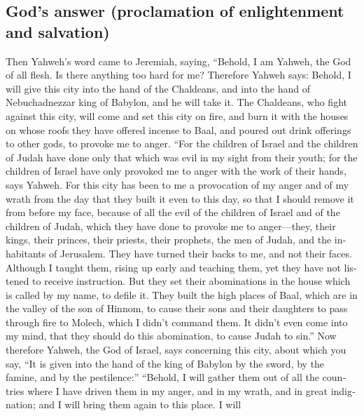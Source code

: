 \begin{paracol}{2}
\begin{otherlanguage}{english}
\hypertarget{gods-answer-proclamation-of-enlightenment-and-salvation}{%
\subsection{God's answer (proclamation of enlightenment and
salvation)}\label{gods-answer-proclamation-of-enlightenment-and-salvation}}

 Then Yahweh's word came to Jeremiah, saying,
 ``Behold, I am Yahweh, the God of all flesh. Is there
anything too hard for me?  Therefore Yahweh says: Behold,
I will give this city into the hand of the Chaldeans, and into the hand
of Nebuchadnezzar king of Babylon, and he will take it. 
The Chaldeans, who fight against this city, will come and set this city
on fire, and burn it with the houses on whose roofs they have offered
incense to Baal, and poured out drink offerings to other gods, to
provoke me to anger.  ``For the children of Israel and
the children of Judah have done only that which was evil in my sight
from their youth; for the children of Israel have only provoked me to
anger with the work of their hands, says Yahweh.  For
this city has been to me a provocation of my anger and of my wrath from
the day that they built it even to this day, so that I should remove it
from before my face,  because of all the evil of the
children of Israel and of the children of Judah, which they have done to
provoke me to anger---they, their kings, their princes, their priests,
their prophets, the men of Judah, and the inhabitants of Jerusalem.
 They have turned their backs to me, and not their faces.
Although I taught them, rising up early and teaching them, yet they have
not listened to receive instruction.  But they set their
abominations in the house which is called by my name, to defile it.
 They built the high places of Baal, which are in the
valley of the son of Hinnom, to cause their sons and their daughters to
pass through fire to Molech, which I didn't command them. It didn't even
come into my mind, that they should do this abomination, to cause Judah
to sin.''  Now therefore Yahweh, the God of Israel, says
concerning this city, about which you say, ``It is given into the hand
of the king of Babylon by the sword, by the famine, and by the
pestilence:''  ``Behold, I will gather them out of all
the countries where I have driven them in my anger, and in my wrath, and
in great indignation; and I will bring them again to this place. I will

\end{otherlanguage}
\end{paracol}
